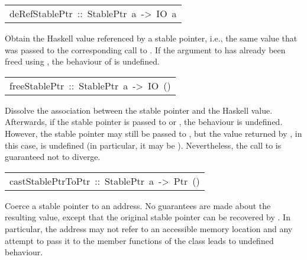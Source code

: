 \begin{haddockdesc}
\item[\begin{tabular}{@{}l}
deRefStablePtr\ ::\ StablePtr\ a\ ->\ IO\ a
\end{tabular}]\haddockbegindoc
Obtain the Haskell value referenced by a stable pointer, i.e., the
 same value that was passed to the corresponding call to
 .  If the argument to  has
 already been freed using , the behaviour of
  is undefined.
\par

\end{haddockdesc}
\begin{haddockdesc}
\item[\begin{tabular}{@{}l}
freeStablePtr\ ::\ StablePtr\ a\ ->\ IO\ ()
\end{tabular}]\haddockbegindoc
Dissolve the association between the stable pointer and the Haskell
 value. Afterwards, if the stable pointer is passed to
  or , the behaviour is
 undefined.  However, the stable pointer may still be passed to
 , but the  value returned
 by , in this case, is undefined (in particular,
 it may be ).  Nevertheless, the call
 to  is guaranteed not to diverge.
\par

\end{haddockdesc}
\begin{haddockdesc}
\item[\begin{tabular}{@{}l}
castStablePtrToPtr\ ::\ StablePtr\ a\ ->\ Ptr\ ()
\end{tabular}]\haddockbegindoc
Coerce a stable pointer to an address. No guarantees are made about
 the resulting value, except that the original stable pointer can be
 recovered by .  In particular, the address may not
 refer to an accessible memory location and any attempt to pass it to
 the member functions of the class  leads to
 undefined behaviour.
\par

\end{haddockdesc}
